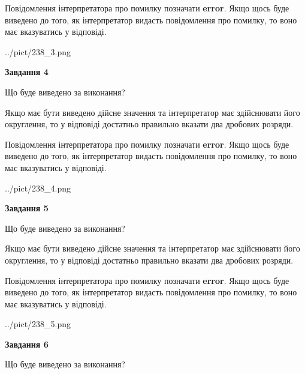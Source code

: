 \documentclass[12pt, ukrainian]{article}
\begin{document}
{\begin {Large}
Повідомлення інтерпретатора про помилку позначати \textbf{error}.
Якщо щось буде виведено до того, як інтерпретатор видасть повідомлення про помилку, 
то воно має вказуватись у відповіді. \par

\begin{center}
	{../pict/238_3.png}
\end{center}
\newpage

{\begin {center}\textbf{Завдання 4}\end {center}}\par
Що буде виведено за виконання? \par

Якщо має бути виведено дійсне значення та інтерпретатор має здійснювати його округлення, 
то у відповіді достатньо правильно вказати два дробових розряди.

Повідомлення інтерпретатора про помилку позначати \textbf{error}.
Якщо щось буде виведено до того, як інтерпретатор видасть повідомлення про помилку, 
то воно має вказуватись у відповіді. \par

\begin{center}
	{../pict/238_4.png}
\end{center}
\newpage

{\begin {center}\textbf{Завдання 5}\end {center}}\par
Що буде виведено за виконання? \par

Якщо має бути виведено дійсне значення та інтерпретатор має здійснювати його округлення, 
то у відповіді достатньо правильно вказати два дробових розряди.

Повідомлення інтерпретатора про помилку позначати \textbf{error}.
Якщо щось буде виведено до того, як інтерпретатор видасть повідомлення про помилку, 
то воно має вказуватись у відповіді. \par

\begin{center}
	{../pict/238_5.png}
\end{center}
\newpage

{\begin {center}\textbf{Завдання 6}\end {center}}\par
Що буде виведено за виконання? \par


\end{Large}}
\end{document}
